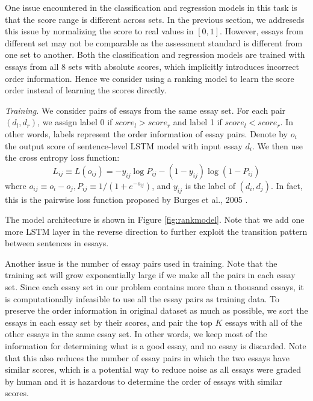\documentclass[10pt,psamsfonts]{amsart}
\theoremstyle{definition}
\theoremstyle{remark}
\numberwithin{equation}{section}
\begin{document}
One issue encountered in the classification and regression models in this task is that the score range is different across sets. In the previous section, we addreseds this issue by normalizing the score to real values in $[0, 1]$. However, essays from different set may not be comparable as the assessment standard is different from one set to another. Both the classification and regression models are trained with essays from all 8 sets with absolute scores, which implicitly introduces incorrect order information. Hence we consider using a ranking model to learn the score order instead of learning the scores directly. 

{\em Training.} We consider pairs of essays from the same essay set. For each pair $(d_l, d_r)$, we assign label 0 if $score_l>score_r$ and label 1 if $score_l<score_r$. In other words, labels represent the order information of essay pairs. Denote by $o_i$ the output score of sentence-level LSTM model with input essay $d_i$. We then use the cross entropy loss function:
$$L_{ij}\equiv L(o_{ij})=-y_{ij}\log P_{ij}-(1-y_{ij})\log(1-P_{ij})$$ 
where $o_{ij}\equiv o_i-o_j, P_{ij}\equiv 1/(1+e^{-o_{ij}})$, and $y_{ij}$ is the label of $(d_i, d_j)$. In fact, this is the pairwise loss function proposed by Burges et al., 2005 \cite{ranknet}.

The model architecture is shown in Figure \ref{fig:rankmodel}. Note that we add one more LSTM layer in the reverse direction to further exploit the transition pattern between sentences in essays.

Another issue is the number of essay pairs used in training. Note that the training set will grow exponentially large if we make all the pairs in each essay set. Since each essay set in our problem contains more than a thousand essays, it is computationally infeasible to use all the essay pairs as training data. To preserve the order information in original dataset as much as possible, we sort the essays in each essay set by their scores, and pair the top $K$ essays with all of the other essays in the same essay set. In other words, we keep most of the information for determining what is a good essay, and no essay is discarded. Note that this also reduces the number of essay pairs in which the two essays have similar scores, which is a potential way to reduce noise as all essays were graded by human and it is hazardous to determine the order of essays with similar scores.
\end{document}
